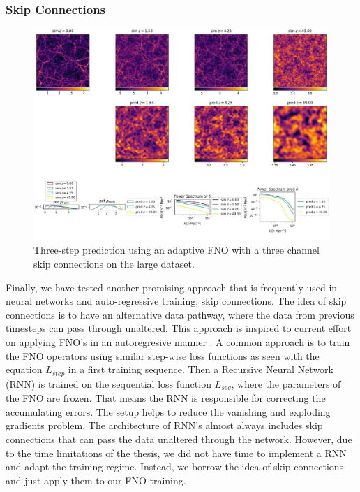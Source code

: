 \documentclass{article}
\begin{document}
\subsubsection{Skip Connections}


\begin{figure}[h]
    \centering
    \includegraphics[width=0.9\linewidth]{img/prediction_sequential(1).jpg}
    \caption{Three-step prediction using an adaptive FNO with a three channel skip connections on the large dataset.}
    \label{fig:mss}
\end{figure}


Finally, we have tested another promising approach that is frequently used in neural networks and auto-regressive training, skip connections. The idea of skip connections is to have an alternative data pathway, where the data from previous timesteps can pass through unaltered.  This approach is inspired to current effort on applying FNO's in an autoregresive manner \citep{li2020fourier, gopakumar2023fourier}. A common approach is to train the FNO operators using similar step-wise loss functions as seen with the equation $L_{step}$ in a first training sequence. Then a Recursive Neural Network (RNN) is trained on the sequential loss function $L_{seq}$, where the parameters of the FNO are frozen. That means the RNN is responsible for correcting the accumulating errors. The setup helps to reduce the vanishing and exploding gradients problem. The architecture of RNN's almost always includes skip connections that can pass the data unaltered through the network. However, due to the time limitations of the thesis, we did not have time to implement a RNN and adapt the training regime. Instead, we borrow the idea of skip connections and just apply them to our FNO training.
\end{document}
